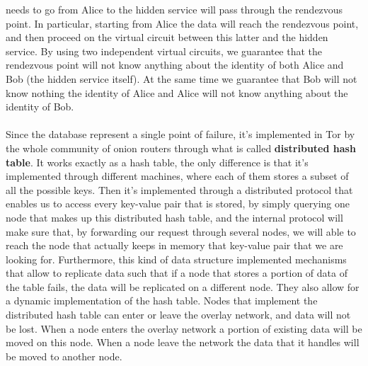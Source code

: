 needs to go from Alice to the hidden service will pass through the rendezvous point. In particular, starting from Alice the data will reach the rendezvous point, and then proceed on the virtual circuit between this latter and the hidden service. By using two independent virtual circuits, we guarantee that the rendezvous point will not know anything about the identity of both Alice and Bob (the hidden service itself). At the same time we guarantee that Bob will not know nothing the identity of Alice and Alice will not know anything about the identity of Bob.\\\\Since the database represent a single point of failure, it's implemented in Tor by the whole community of onion routers through what is called \textbf{distributed hash table}. It works exactly as a hash table, the only difference is that it's implemented through different machines, where each of them stores a subset of all the possible keys. Then it's implemented through a distributed protocol that enables us to access every key-value pair that is stored, by simply querying one node that makes up this distributed hash table, and the internal protocol will make sure that, by forwarding our request through several nodes, we will able to reach the node that actually keeps in memory that key-value pair that we are looking for. Furthermore, this kind of data structure implemented mechanisms that allow to replicate data such that if a node that stores a portion of data of the table fails, the data will be replicated on a different node. They also allow for a dynamic implementation of the hash table. Nodes that implement the distributed hash table can enter or leave the overlay network, and data will not be lost. When a node enters the overlay network a portion of existing data will be moved on this node. When a node leave the network the data that it handles will be moved to another node.